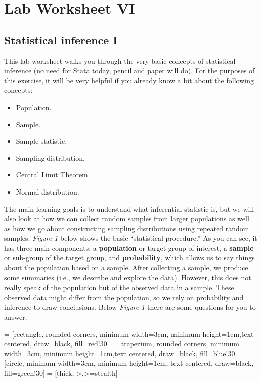 \documentclass{article}
\begin{document}
\section*{\hfil Lab Worksheet VI \hfil}
\subsection*{Statistical inference I}

This lab worksheet walks you through the very basic concepts of statistical inference (no need for Stata today, pencil and paper will do). For the purposes of this exercise, it will be very helpful if you already know a bit about the following concepts:

\begin{itemize}
    \item Population.
    \item Sample.
    \item Sample statistic.
    \item Sampling distribution.
    \item Central Limit Theorem.
    \item Normal distribution.
\end{itemize}

The main learning goals is to understand what inferential statistic is, but we will also look at how we can collect random samples from larger populations as well as how we go about constructing sampling distributions using repeated random samples. \textit{Figure 1} below shows the basic ``statistical procedure.'' As you can see, it has three main components: a \textbf{population} or target group of interest, a \textbf{sample} or sub-group of the target group, and \textbf{probability}, which allows us to say things about the population based on a sample. After collecting a sample, we produce some summaries (i.e., we describe and explore the data). However, this does not really speak of the population but of the observed data in a sample. These observed data might differ from the population, so we rely on probability and inference to draw conclusions. Below \textit{Figure 1} there are some questions for you to answer. 

 = [rectangle, rounded corners, minimum width=3cm, minimum height=1cm,text centered, draw=black, fill=red!30]
 = [trapezium, rounded corners, minimum width=3cm, minimum height=1cm,text centered, draw=black, fill=blue!30]
 = [circle, minimum width=3cm, minimum height=1cm, text centered, draw=black, fill=green!30]
 = [thick,->,>=stealth]
\end{document}

